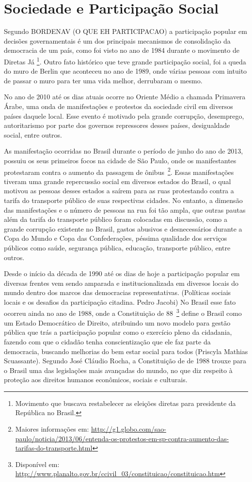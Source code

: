 \chapter{Sociedade e Participação Social}
\label{cap:sociedadepsocial}

Segundo BORDENAV (O QUE EH PARTICIPACAO) a participação popular em decisões governamentais é um dos principais mecanismos de consolidação da democracia de um país, como foi visto no ano de 1984 durante o movimento de Diretas Já \footnote{Movimento que buscava restabelecer as eleições diretas para presidente da República no Brasil.}. Outro fato histórico que teve grande participação social, foi a queda do muro de Berlin que aconteceu no ano de 1989, onde várias pessoas com intuito de passar o muro para ter uma vida melhor, derrubaram o mesmo. 

No ano de 2010 até os dias atuais ocorre no Oriente Médio a chamada Primavera Árabe, uma onda de manifestações e protestos da sociedade civil em diversos países daquele local. Esse evento é motivado pela grande corrupção, desemprego, autoritarismo por parte dos governos repressores desses países, desigualdade social, entre outros.  

As manifestação ocorridas no Brasil durante o período de junho do ano de 2013, possuiu os seus primeiros focos na cidade de São Paulo, onde os manifestantes protestaram contra o aumento da passagem de ônibus~\footnote{Maiores informações em: \url{http://g1.globo.com/sao-paulo/noticia/2013/06/entenda-os-protestos-em-sp-contra-aumento-das-tarifas-do-transporte.html}}. Essas manifestações tiveram uma grande repercussão social em diversos estados do Brasil, o qual motivou as pessoas desses estados a saírem para as ruas protestando contra a tarifa do transporte público de suas respectivas cidades. No entanto, a dimensão das manifestações e o número de pessoas na rua foi tão ampla, que outras pautas além da tarifa do transporte público foram colocadas em discussão, como a grande corrupção existente no Brasil, gastos abusivos e desnecessários durante a Copa do Mundo e Copa das Confederações, péssima qualidade dos serviços públicos como saúde, segurança pública, educação, transporte público, entre outros.

Desde o início da década de 1990 até os dias de hoje a participação popular em diversas frentes vem sendo amparada e institucionalizada em diversos locais do mundo dentro dos marcos das democracias representativas. (Políticas sociais locais e os desafios da participação citadina. Pedro Jacobi) No Brasil esse fato ocorreu ainda no ano de 1988, onde a Constituição de 88~\footnote{Disponível em: \url{http://www.planalto.gov.br/ccivil_03/constituicao/constituicao.htm}} define o Brasil como um Estado Democrático de Direito, atribuindo um novo modelo para gestão pública que trás a participação popular como o exercício pleno da cidadania, fazendo com que o cidadão tenha conscientização que ele faz parte da democracia, buscando melhorias do bem estar social para todos (Priscyla Mathias Scuassante). Segundo José Cláudio Rocha, a Constituição de de 1988 trouxe para o Brasil uma das legislações mais avançadas do mundo, no que diz respeito à proteção aos direitos humanos econômicos, sociais e culturais.


